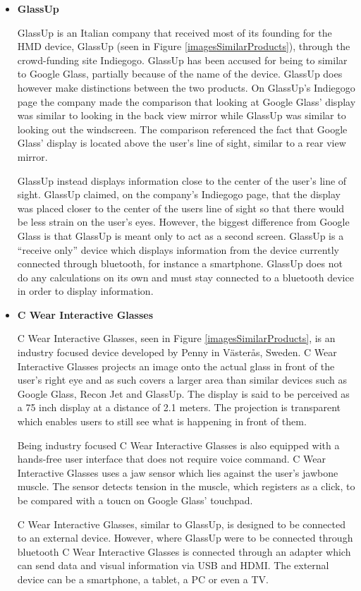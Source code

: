 \begin{itemize}
\item \textbf{GlassUp}\cite{glassUp}

GlassUp is an Italian company that received most of its founding for the HMD device, GlassUp (seen in Figure \ref{imagesSimilarProducts}), through the crowd-funding site Indiegogo.\cite{glassUpIndiegogo} GlassUp has been accused for being to similar to Google Glass, partially because of the name of the device.\cite{glassUpLegal} GlassUp does however make distinctions between the two products. On GlassUp's Indiegogo page the company made the comparison that looking at Google Glass' display was similar to looking in the back view mirror while GlassUp was similar to looking out the windscreen. The comparison referenced the fact that Google Glass' display is located above the user's line of sight, similar to a rear view mirror.

GlassUp instead displays information close to the center of the user's line of sight. GlassUp claimed, on the company's Indiegogo page, that the display was placed closer to the center of the users line of sight so that there would be less strain on the user's eyes. However, the biggest difference from Google Glass is that GlassUp is meant only to act as a second screen. GlassUp is a ``receive only'' device which displays information from the device currently connected through bluetooth, for instance a smartphone. GlassUp does not do any calculations on its own and must stay connected to a bluetooth device in order to display information.\cite{glassUpIndiegogo}

\item \textbf{C Wear Interactive Glasses}\cite{penny}

C Wear Interactive Glasses, seen in Figure \ref{imagesSimilarProducts}, is an industry focused device developed by Penny in V{\"a}ster{\aa}s, Sweden. C Wear Interactive Glasses projects an image onto the actual glass in front of the user's right eye and as such covers a larger area than similar devices such as Google Glass, Recon Jet and GlassUp.\cite{pennyDisplay} The display is said to be perceived as a 75 inch display at a distance of 2.1 meters.\cite{pennyProducts} The projection is transparent which enables users to still see what is happening in front of them.

Being industry focused C Wear Interactive Glasses is also equipped with a hands-free user interface  that does not require voice command. C Wear Interactive Glasses uses a jaw sensor which lies against the user's jawbone muscle. The sensor detects tension in the muscle, which registers as a click, to be compared with a toucn on Google Glass' touchpad.\cite{pennyProducts}

C Wear Interactive Glasses, similar to GlassUp, is designed to be connected to an external device.\cite{pennyProducts} However, where GlassUp were to be connected through bluetooth C Wear Interactive Glasses is connected through an adapter which can send data and visual information via USB and HDMI. The external device can be a smartphone, a tablet, a PC or even a TV.
\end{itemize}
\hfill

